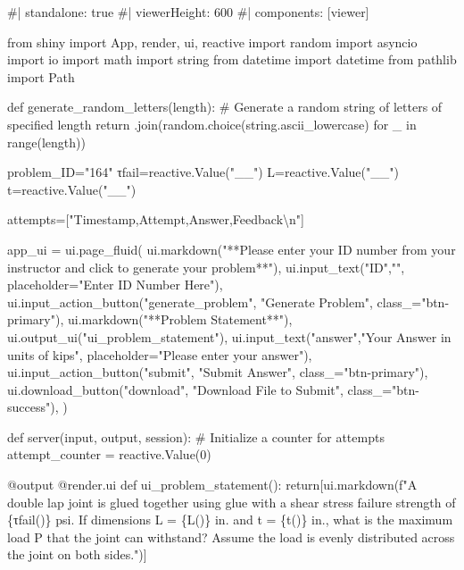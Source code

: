 \documentclass[
  letterpaper,
  DIV=11,
  numbers=noendperiod]{scrreprt}
\newenvironment{Shaded}{\begin{snugshade}}{\end{snugshade}}
\newcommand{\NormalTok}[1]{\textcolor[rgb]{0.00,0.23,0.31}{#1}}
\begin{document}
\begin{Shaded}
\begin{Highlighting}[]
\NormalTok{\#| standalone: true}
\NormalTok{\#| viewerHeight: 600}
\NormalTok{\#| components: [viewer]}

\NormalTok{from shiny import App, render, ui, reactive}
\NormalTok{import random}
\NormalTok{import asyncio}
\NormalTok{import io}
\NormalTok{import math}
\NormalTok{import string}
\NormalTok{from datetime import datetime}
\NormalTok{from pathlib import Path}

\NormalTok{def generate\_random\_letters(length):}
\NormalTok{    \# Generate a random string of letters of specified length}
\NormalTok{    return \textquotesingle{}\textquotesingle{}.join(random.choice(string.ascii\_lowercase) for \_ in range(length))  }

\NormalTok{problem\_ID="164"}
\NormalTok{τfail=reactive.Value("\_\_")}
\NormalTok{L=reactive.Value("\_\_")}
\NormalTok{t=reactive.Value("\_\_")}

\NormalTok{attempts=["Timestamp,Attempt,Answer,Feedback\textbackslash{}n"]}

\NormalTok{app\_ui = ui.page\_fluid(}
\NormalTok{    ui.markdown("**Please enter your ID number from your instructor and click to generate your problem**"),}
\NormalTok{    ui.input\_text("ID","", placeholder="Enter ID Number Here"),}
\NormalTok{    ui.input\_action\_button("generate\_problem", "Generate Problem", class\_="btn{-}primary"),}
\NormalTok{    ui.markdown("**Problem Statement**"),}
\NormalTok{    ui.output\_ui("ui\_problem\_statement"),}
\NormalTok{    ui.input\_text("answer","Your Answer in units of kips", placeholder="Please enter your answer"),}
\NormalTok{    ui.input\_action\_button("submit", "Submit Answer", class\_="btn{-}primary"),}
\NormalTok{    ui.download\_button("download", "Download File to Submit", class\_="btn{-}success"),}
\NormalTok{)}


\NormalTok{def server(input, output, session):}
\NormalTok{    \# Initialize a counter for attempts}
\NormalTok{    attempt\_counter = reactive.Value(0)}

\NormalTok{    @output}
\NormalTok{    @render.ui}
\NormalTok{    def ui\_problem\_statement():}
\NormalTok{        return[ui.markdown(f"A double lap joint is glued together using glue with a shear stress failure strength of \{τfail()\} psi. If dimensions L = \{L()\} in. and t = \{t()\} in., what is the maximum load P that the joint can withstand? Assume the load is evenly distributed across the joint on both sides.")]}
    

\end{Highlighting}
\end{Shaded}
\end{document}
